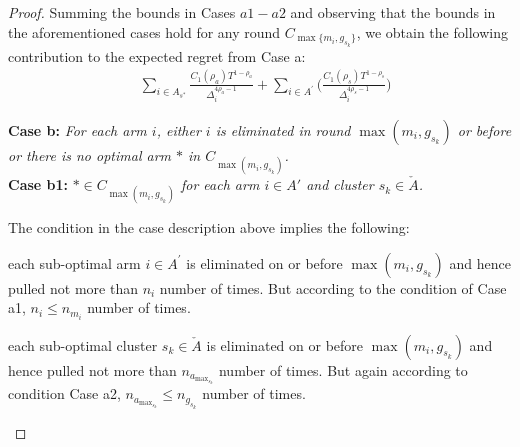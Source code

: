 \begin{proof}




Summing the bounds in Cases $a1-a2$ and observing that the bounds in the aforementioned cases hold for any round $C_{\max \lbrace m_i,g_{s_k}\rbrace}$, we obtain the following contribution to the expected regret from Case a:
\begin{align*}
&\sum_{i\in A_{s^*}} \frac{C_{1}(\rho_{a})T^{1-\rho_{a}}}{\Delta_{i}^{4\rho_{a}-1}} + \sum_{i\in A^{'}}\bigg(\frac{C_{1}(\rho_{s})T^{1-\rho_{s}}}{\Delta_{i}^{4\rho_{s}-1}}\bigg)
\end{align*}



\textbf{Case b:} \textit{For each arm $i$, either ${i}$ is eliminated in round $\max (m_{i},g_{s_{k}})$ or before or there is no optimal arm ${*}$ in $C_{\max(m_{i},g_{s_{k}})}$.} \\

\textbf{Case b1:} \textit{${*}\in C_{\max(m_{i},g_{s_{k}})}$ for each arm $i \in A'$ and cluster $s_k \in \check A$.} 


The condition in the case description above implies the following: \\
\begin{inparaenum}[\bfseries (i)]
\item each sub-optimal arm ${i}\in A^{'}$ is  eliminated on or before $\max (m_{i},g_{s_{k}})$ and hence  pulled not more than $n_{i}$ number of times. But according to the condition of Case a1, $n_{i} \leq n_{m_{i}}$ number of times.\\
\item each sub-optimal cluster $s_k \in \check A$ is eliminated on or before $\max (m_{i},g_{s_{k}})$ and hence  pulled not more than $n_{a_{\max_{s_{k}}}}$ number of times. But again according to condition Case a2,  $n_{a_{\max_{s_{k}}}} \leq n_{g_{s_{k}}}$ number of times.
\end{inparaenum}


\end{proof}
